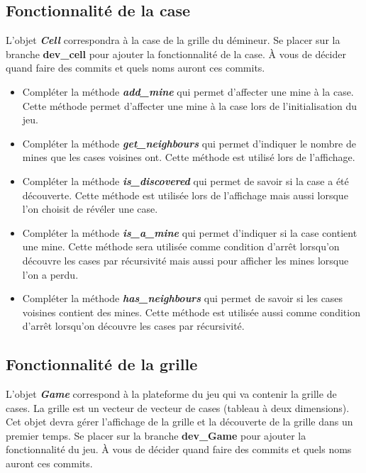 \subsection{Fonctionnalité de la case}
L'objet \textit{\textbf{Cell}} correspondra à la case de la grille du démineur. Se placer sur la branche \textbf{dev\_cell} pour ajouter la fonctionnalité de la case. À vous de décider quand faire des commits et quels noms auront ces commits.

\medskip

\begin{itemize}
    \item Compléter la méthode \textit{\textbf{add\_mine}} qui permet d'affecter une mine à la case. Cette méthode permet d'affecter une mine à la case lors de l'initialisation du jeu.
    \medskip
    \item Compléter la méthode \textit{\textbf{get\_neighbours}} qui permet d'indiquer le nombre de mines que les cases voisines ont. Cette méthode est utilisé lors de l'affichage.
    \medskip
    \item Compléter la méthode \textit{\textbf{is\_discovered}} qui permet de savoir si la case a été découverte. Cette méthode est utilisée lors de l'affichage mais aussi lorsque l'on choisit de révéler une case.
    \medskip
    \item Compléter la méthode \textit{\textbf{is\_a\_mine}} qui permet d'indiquer si la case contient une mine. Cette méthode sera utilisée comme condition d'arrêt lorsqu'on découvre les cases par récursivité mais aussi pour afficher les mines lorsque l'on a perdu.
    \medskip
    \item Compléter la méthode \textit{\textbf{has\_neighbours}} qui permet de savoir si les cases voisines contient des mines. Cette méthode est utilisée aussi comme condition d'arrêt lorsqu'on découvre les cases par récursivité.
\end{itemize}

\subsection{Fonctionnalité de la grille}
L'objet \textit{\textbf{Game}} correspond à la plateforme du jeu qui va contenir la grille de cases. La grille est un vecteur de vecteur de cases (tableau à deux dimensions). Cet objet devra gérer l'affichage de la grille et la découverte de la grille dans un premier temps. Se placer sur la branche \textbf{dev\_Game} pour ajouter la fonctionnalité du jeu. À vous de décider quand faire des commits et quels noms auront ces commits.

